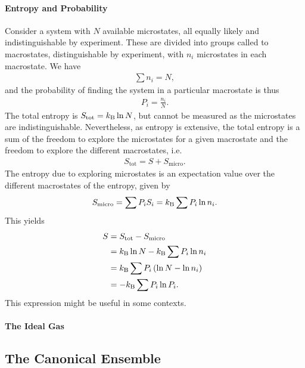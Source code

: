 \paragraph{Entropy and Probability}
Consider a system with $N$ available microstates, all equally likely and indistinguishable by experiment. These are divided into groups called to macrostates, distinguishable by experiment, with $n_{i}$ microstates in each macrostate. We have
\begin{align*}
	\sum n_{i} = N,
\end{align*}
and the probability of finding the system in a particular macrostate is thus
\begin{align*}
	P_{i} = \frac{n_{i}}{N}.
\end{align*}
The total entropy is $S_{\text{tot}} = k_{\text{B}}\ln{N}$, but cannot be measured as the microstates are indistinguishable. Nevertheless, as entropy is extensive, the total entropy is a sum of the freedom to explore the microstates for a given macrostate and the freedom to explore the different macrostates, i.e.
\begin{align*}
	S_{\text{tot}} = S + S_{\text{micro}}.
\end{align*}
The entropy due to exploring microstates is an expectation value over the different macrostates of the entropy, given by
\begin{align*}
	S_{\text{micro}} = \sum P_{i}S_{i} = k_{\text{B}}\sum P_{i}\ln{n_{i}}.
\end{align*}
This yields
\begin{align*}
	S &= S_{\text{tot}} - S_{\text{micro}} \\
      &= k_{\text{B}}\ln{N} - k_{\text{B}}\sum P_{i}\ln{n_{i}} \\
      &= k_{\text{B}}\sum P_{i}\left(\ln{N} - \ln{n_{i}}\right) \\
      &= -k_{\text{B}}\sum P_{i}\ln{P_{i}}.
\end{align*}
This expression might be useful in some contexts.

\paragraph{The Ideal Gas}

\subsection{The Canonical Ensemble}

